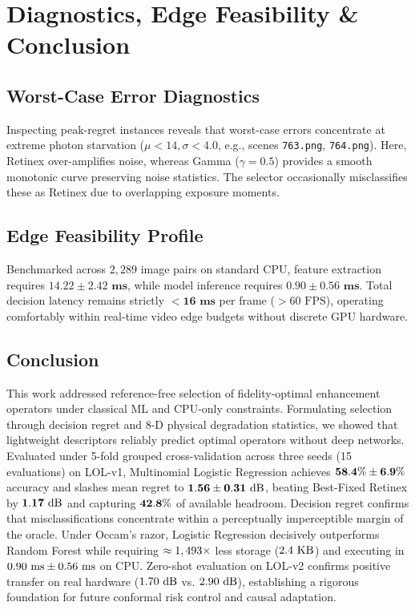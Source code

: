 \documentclass[journal]{IEEEtran}
\begin{document}
\section{Diagnostics, Edge Feasibility \& Conclusion}

\subsection{Worst-Case Error Diagnostics}
Inspecting peak-regret instances reveals that worst-case errors concentrate at extreme photon starvation ($\mu < 14, \sigma < 4.0$, e.g., scenes \texttt{763.png}, \texttt{764.png}). Here, Retinex over-amplifies noise, whereas Gamma ($\gamma=0.5$) provides a smooth monotonic curve preserving noise statistics. The selector occasionally misclassifies these as Retinex due to overlapping exposure moments.

\subsection{Edge Feasibility Profile}
Benchmarked across $2,289$ image pairs on standard CPU, feature extraction requires $\mathbf{14.22 \pm 2.42\text{ ms}}$, while model inference requires $\mathbf{0.90 \pm 0.56\text{ ms}}$. Total decision latency remains strictly $\mathbf{< 16\text{ ms}}$ per frame ($> 60\text{ FPS}$), operating comfortably within real-time video edge budgets without discrete GPU hardware.

\subsection{Conclusion}
This work addressed reference-free selection of fidelity-optimal enhancement operators under classical ML and CPU-only constraints. Formulating selection through decision regret and 8-D physical degradation statistics, we showed that lightweight descriptors reliably predict optimal operators without deep networks. Evaluated under 5-fold grouped cross-validation across three seeds (15 evaluations) on LOL-v1, Multinomial Logistic Regression achieves $\mathbf{58.4\% \pm 6.9\%}$ accuracy and slashes mean regret to $\mathbf{1.56 \pm 0.31\text{ dB}}$, beating Best-Fixed Retinex by $\mathbf{1.17\text{ dB}}$ and capturing $\mathbf{42.8\%}$ of available headroom. Decision regret confirms that misclassifications concentrate within a perceptually imperceptible margin of the oracle. Under Occam's razor, Logistic Regression decisively outperforms Random Forest while requiring $\approx 1,493\times$ less storage ($2.4\text{ KB}$) and executing in $0.90\text{ ms} \pm 0.56\text{ ms}$ on CPU. Zero-shot evaluation on LOL-v2 confirms positive transfer on real hardware ($1.70\text{ dB}$ vs. $2.90\text{ dB}$), establishing a rigorous foundation for future conformal risk control and causal adaptation.
\end{document}
